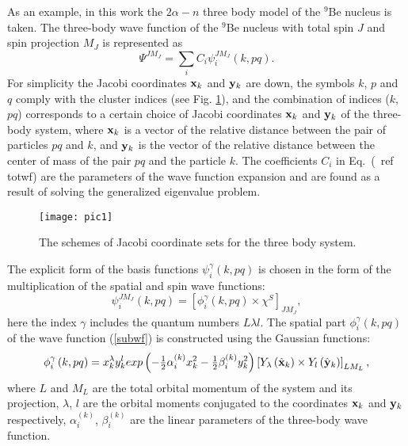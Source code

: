 \documentclass[
12pt, %
oneside, %
english, %
onehalfspacing, %
onehalfspacing, %
headsepline, %
]{MastersDoctoralThesis} %
\begin{document}
As an example, in this work the $2\alpha-n$ three body model of the $^9$Be nucleus is taken. The three-body wave function of the $^9$Be nucleus with total spin $ J $ and spin projection $ M_J $ is represented as
 \begin{equation}
 \Psi^{JM_J}= \sum_{i} C_{i} \psi_{i}^{JM_J} \left( k,pq \right).
 \label{totwf}
 \end{equation}
For simplicity the Jacobi coordinates $ {\bf x}_k $ and $ {\bf y}_k $ are down, the symbols $ k $, $ p $ and $ q $ comply with the cluster indices (see Fig. \ref{fig:jacobiSet}), and the combination of indices ($ k $, $ pq $) corresponds to a certain choice of Jacobi coordinates $ {\bf x}_k $ and $ {\bf y}_k $ of the three-body system, where $ {\bf x}_k $ is a vector of the relative distance between the pair of particles $ pq $ and $ k $, and $ {\bf y}_k $ is the vector of the relative distance between the center of mass of the pair $ pq $ and the particle $ k $. 
The coefficients $ C_{i} $ in Eq.~(\ ref {totwf}) are the parameters of the wave function expansion and are found as a result of solving the generalized eigenvalue problem. 

\begin{figure}[b]
\centering
\texttt{[image: pic1]}
\decoRule
\caption{\footnotesize The schemes of Jacobi coordinate sets for the three body system.}
\label{fig:jacobiSet}
\end{figure}

The explicit form of the basis functions $ \psi_{i}^{\gamma} \left(k, pq \right) $ is chosen in the form of the multiplication of the spatial and spin wave functions:
\begin{equation}
\psi_{i}^{JM_J}\left(k, pq \right) = \left[ \phi_{i}^{\gamma} \left(k, pq \right) 
\times \chi^{S} \right] _{JM_{J}},
\label{subwf}
\end{equation}
here the index $\gamma$ includes the quantum numbers $L \lambda l$. The spatial part $\phi_{i}^{\gamma} \left(k, pq \right) $ of the wave function (\ref {subwf}) is constructed using the Gaussian functions:
 \begin{equation}
 \phi_{i}^{\gamma} \left(k, pq \right) =
 x_{k}^{\lambda} y_{k}^{l} exp\left(- \tfrac{1}{2}\alpha^{(k)}_{i} x_{k}^{2} - \tfrac{1}{2} \beta^{(k)}_{i}  y_{k}^{2} \right) 
 \left[ Y_\lambda \left(  \hat{ \bf x}_k \right) \times Y_l \left( \hat{\bf y}_k \right) \right]_{LM_L},
 \label{radial_wf}
 \end{equation}
where $ L $ and $ M_L $ are the total orbital momentum of the system and its projection, $ \lambda $, $ l $ are the orbital moments conjugated to the coordinates $ {\bf x} _k $ and $ {\bf y} _k $ respectively, $ \alpha^{(k)} _ {i} $, $ \beta^{(k)}_{i}$ are the linear parameters of the three-body wave function.
\end{document}
